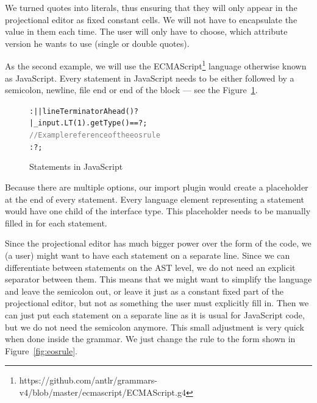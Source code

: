 We turned quotes into literals, thus ensuring that they will only appear in the projectional editor as fixed constant cells.
We will not have to encapsulate the value in them each time.
The user will only have to choose, which attribute version he wants to use (single or double quotes).

As the second example, we will use the ECMAScript\footnote{https://github.com/antlr/grammars-v4/blob/master/ecmascript/ECMAScript.g4} language otherwise known as JavaScript.
Every statement in JavaScript needs to be either followed by a semicolon, newline, file end or end of the block --- see the Figure~\ref{fig:javascriptstmt}.

\begin{figure}[ht]
\centering
\begin{framed}
\begin{alltt}
	 :  |  | {lineTerminatorAhead()}? 
	    | {{\_}input.LT(1).getType() == }? ;
	\textcolor{gray}{// Example reference of the eos rule}
	 :  ?  ;
\end{alltt}
\end{framed}
\caption{Statements in JavaScript}
\label{fig:javascriptstmt}
\end{figure}

Because there are multiple options, our import plugin would create a placeholder at the end of every statement.
Every language element representing a statement would have one child of the  interface type.
This placeholder needs to be manually filled in for each statement.

Since the projectional editor has much bigger power over the form of the code, we (a user) might want to have each statement on a separate line.
Since we can differentiate between statements on the AST level, we do not need an explicit separator between them.
This means that we might want to simplify the language and leave the semicolon out, or leave it just as a constant fixed part of the projectional editor, but not as something the user must explicitly fill in.
Then we can just put each statement on a separate line as it is usual for JavaScript code, but we do not need the semicolon anymore.
This small adjustment is very quick when done inside the grammar.
We just change the  rule to the form shown in Figure~\ref{fig:eosrule}.

